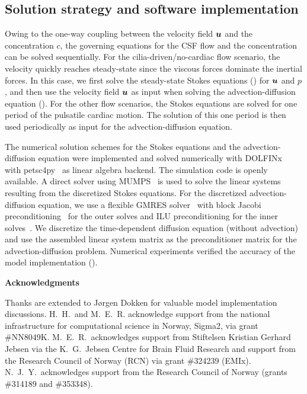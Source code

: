 \documentclass{WileyMSP-template}
\begin{document}
\subsection{Solution strategy and software implementation}
Owing to the one-way coupling between the velocity field $\bm{u}$
and the concentration $c$, the governing equations for the
CSF flow and the concentration can be solved sequentially.
For the cilia-driven/no-cardiac flow scenario, the velocity quickly reaches steady-state since
the viscous forces dominate the inertial forces.
In this case, we first solve the steady-state Stokes equations ()
for $\bm{u}$ and $p$, and then use the velocity field $\bm{u}$ as input when solving
the advection-diffusion equation ().
For the other flow scenarios, the Stokes equations are solved for one
period of the pulsatile cardiac motion. The solution of this one period
is then used periodically as input for the advection-diffusion equation.

The numerical solution schemes for the Stokes equations and the
advection-diffusion equation were implemented and solved numerically with
DOLFINx~\cite{dolfinx2023preprint} with petsc4py~\cite{Dalcin2011ParallelPython}
as linear algebra backend. The simulation code is openly
available.
A direct solver using MUMPS~\cite{Amestoy2011Mumps} is used to solve the
linear systems resulting from the discretized Stokes equations.
For the discretized advection-diffusion equation, we use a flexible GMRES solver~\cite{fgmres}
with block Jacobi preconditioning~\cite{Jacobi1845UeberGleichungen} for the outer solves
and ILU preconditioning for the inner solves~\cite{chan1997approximate}. 
We discretize the time-dependent diffusion equation (without advection)
and use the assembled linear system matrix
as the preconditioner matrix for the advection-diffusion problem.
Numerical experiments verified the accuracy of the model implementation
(). 


\medskip
\noindent \textbf{Acknowledgments} \par
\noindent Thanks are extended to J\o rgen Dokken
for valuable model implementation discussions.  H.~H.~and
M.~E.~R. acknowledge support from the national infrastructure for
computational science in Norway, Sigma2, via grant
\#NN8049K. M.~E.~R.~acknowledges support from Stiftelsen Kristian
Gerhard Jebsen via the K.~G.~Jebsen Centre for Brain Fluid Research
and support from the Research Council of Norway (RCN) via grant
\#324239 (EMIx). N.~J.~Y.~acknowledges support from the Research
Council of Norway (grants \#314189 and \#353348).
\end{document}
